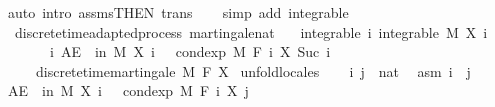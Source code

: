 \begin{isabellebody}
\ {\isacharparenleft}{\kern0pt}auto\ intro{\isacharcolon}{\kern0pt}\ assms{\isacharparenleft}{\kern0pt}{}{\isacharparenright}{\kern0pt}{\isacharbrackleft}{\kern0pt}THEN\ trans{\isacharbrackright}{\kern0pt}{\isacharparenright}{\kern0pt}\isanewline
\ \ \isamarkupfalse%
\isanewline
{}\isamarkupfalse%
\ {\isacharparenleft}{\kern0pt}simp\ add{\isacharcolon}{\kern0pt}\ integrable{\isacharparenright}{\kern0pt}%
\endisatagproof
{\isafoldproof}%
%
\isadelimproof
\isanewline
%
\endisadelimproof
\isanewline
{}\isamarkupfalse%
\ {\isacharparenleft}{\kern0pt}\ discrete{\isacharunderscore}{\kern0pt}time{\isacharunderscore}{\kern0pt}adapted{\isacharunderscore}{\kern0pt}process{\isacharparenright}{\kern0pt}\ martingale{\isacharunderscore}{\kern0pt}nat{\isacharcolon}{\kern0pt}\isanewline
\ \ \ integrable{\isacharcolon}{\kern0pt}\ {\isachardoublequoteopen}{\isasymAnd}i{\isachardot}{\kern0pt}\ integrable\ M\ {\isacharparenleft}{\kern0pt}X\ i{\isacharparenright}{\kern0pt}{\isachardoublequoteclose}\ \isanewline
\ \ \ \ \ \ \ {\isachardoublequoteopen}{\isasymAnd}i{\isachardot}{\kern0pt}\ AE\ {\isasymxi}\ in\ M{\isachardot}{\kern0pt}\ X\ i\ {\isasymxi}\ {\isacharequal}{\kern0pt}\ cond{\isacharunderscore}{\kern0pt}exp\ M\ {\isacharparenleft}{\kern0pt}F\ i{\isacharparenright}{\kern0pt}\ {\isacharparenleft}{\kern0pt}X\ {\isacharparenleft}{\kern0pt}Suc\ i{\isacharparenright}{\kern0pt}{\isacharparenright}{\kern0pt}\ {\isasymxi}{\isachardoublequoteclose}\ \isanewline
\ \ \ \ \ {\isachardoublequoteopen}discrete{\isacharunderscore}{\kern0pt}time{\isacharunderscore}{\kern0pt}martingale\ M\ F\ X{\isachardoublequoteclose}\isanewline
%
\isadelimproof
%
\endisadelimproof
%
\isatagproof
{}\isamarkupfalse%
\ {\isacharparenleft}{\kern0pt}unfold{\isacharunderscore}{\kern0pt}locales{\isacharparenright}{\kern0pt}\isanewline
\ \ \isamarkupfalse%
\ i\ j\ {\isacharcolon}{\kern0pt}{\isacharcolon}{\kern0pt}\ nat\ \isamarkupfalse%
\ asm{\isacharcolon}{\kern0pt}\ {\isachardoublequoteopen}i\ {\isasymle}\ j{\isachardoublequoteclose}\isanewline
\ \ \isamarkupfalse%
\ {\isachardoublequoteopen}AE\ {\isasymxi}\ in\ M{\isachardot}{\kern0pt}\ X\ i\ {\isasymxi}\ {\isacharequal}{\kern0pt}\ cond{\isacharunderscore}{\kern0pt}exp\ M\ {\isacharparenleft}{\kern0pt}F\ i{\isacharparenright}{\kern0pt}\ {\isacharparenleft}{\kern0pt}X\ j{\isacharparenright}{\kern0pt}\ {\isasymxi}{\isachardoublequoteclose}\ \isamarkupfalse%

\end{isabellebody}
